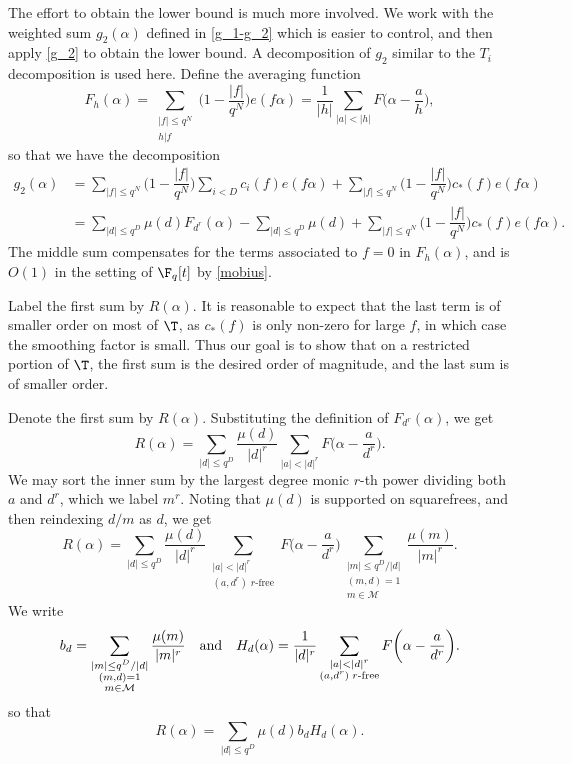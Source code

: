 \documentclass[reqno,11pt]{amsart}
\theoremstyle{definition}
\theoremstyle{remark}
\numberwithin{equation}{section}
\def\calM{{\mathcal M}}
\newcommand{\<}{\begin{equation}}
\renewcommand{\>}{\end{equation}}
\begin{document}
The effort to obtain the lower bound is much more involved. We work with the weighted sum $g_2(\alpha)$ defined in \eqref{g_1-g_2} which is easier to control, and then apply \eqref{g_2} to obtain the lower bound. A decomposition of $g_2$ similar to the $T_i$ decomposition is used here. Define the averaging function
\[F_h(\alpha) = \sum_{\substack{|f|\leq q^N \\ h|f}}\bigg(1-\dfrac{|f|}{q^N}\bigg)e(f\alpha) = \dfrac{1}{|h|} \sum_{|a| < |h|} F\bigg(\alpha - \dfrac{a}{h}\bigg),\]
so that we have the decomposition
\begin{align*}
    g_2(\alpha) &= \sum_{|f| \leq q^N} \bigg(1-\dfrac{|f|}{q^N}\bigg)\sum_{i<D} c_i(f)e(f\alpha) + \sum_{|f| \leq q^N} \bigg(1-\dfrac{|f|}{q^N}\bigg)c_*(f) e(f\alpha) \\
    &= \sum_{|d| \leq q^D} \mu(d)F_{d^r}(\alpha) - \sum_{|d| \leq q^D}\mu(d) + \sum_{|f| \leq q^N} \bigg(1-\dfrac{|f|}{q^N}\bigg)c_*(f) e(f\alpha).
\end{align*}
The middle sum compensates for the terms associated to $f = 0$ in $F_h(\alpha)$, and is $O(1)$ in the setting of $\F_q[t]$ by \eqref{mobius}. 

Label the first sum by $R(\alpha)$. It is reasonable to expect that the last term is of smaller order on most of $\T$, as $c_*(f)$ is only non-zero for large $f$, in which case the smoothing factor is small. Thus our goal is to show that on a restricted portion of $\T$, the first sum is the desired order of magnitude, and the last sum is of smaller order. 

Denote the first sum by $R(\alpha)$. Substituting the definition of $F_{d^r}(\alpha)$, we get
\[R(\alpha) = \sum_{|d| \leq q^D} \dfrac{\mu(d)}{|d|^r}\sum_{|a| < |d|^r} F\bigg(\alpha - \dfrac{a}{d^r}\bigg).\]
We may sort the inner sum by the largest degree monic $r$-th power dividing both $a$ and $d^r$, which we label $m^r$. Noting that $\mu(d)$ is supported on squarefrees, and then reindexing $d/m$ as $d$, we get
\[R(\alpha) = \sum_{|d| \leq q^D}\dfrac{\mu(d)}{|d|^r}\sum_{\substack{|a| < |d|^r \\ (a,d^r) \; r\text{-free}}}F\bigg(\alpha - \dfrac{a}{d^r}\bigg)\sum_{\substack{|m| \leq q^D/|d| \\ (m,d) = 1 \\ m \in \calM}} \dfrac{\mu(m)}{|m|^r}.\]
We write
\[b_d = \sum_{\substack{|m| \leq q^D/|d| \\ (m,d)=1 \\ m \in \calM}}\dfrac{\mu(m)}{|m|^r} \quad {\rm and} \quad H_d(\alpha) = \dfrac{1}{|d|^r}\sum_{\substack{|a| < |d|^r \\ (a,d^r) \; r\text{-free}}}F\bigg(\alpha - \dfrac{a}{d^r}\bigg).\]
so that
\[R(\alpha) = \sum_{|d|\leq q^D}\mu(d)b_dH_d(\alpha).\]
\end{document}
